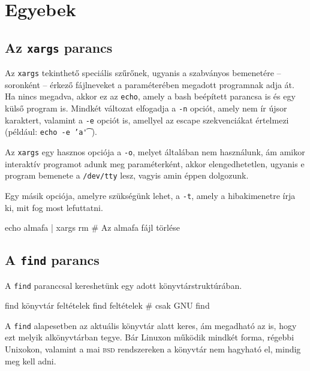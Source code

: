 \chapter{Egyebek}%
\label{cha:others}




\section{Az \texttt{xargs} parancs}

Az \texttt{xargs} tekinthető speciális szűrőnek, ugyanis a szabványos bemenetére
-- soronként -- érkező fájlneveket a paraméterében megadott programnak adja
át. Ha nincs megadva, akkor ez az \texttt{echo}, amely a bash beépített parancsa
is és egy külső program is. Mindkét változat elfogadja a \texttt{-n} opciót,
amely nem ír újsor karaktert, valamint a \texttt{-e} opciót is, amellyel az
escape szekvenciákat értelmezi (például: \texttt{echo -e 'a\t'}).

Az \texttt{xargs} egy hasznos opciója a \texttt{-o}, melyet általában nem
használunk, ám amikor interaktív programot adunk meg paraméterként, akkor
elengedhetetlen, ugyanis e program bemenete a \texttt{/dev/tty} lesz, vagyis
amin éppen dolgozunk.

Egy másik opciója, amelyre szükségünk lehet, a \texttt{-t}, amely a
hibakimenetre írja ki, mit fog most lefuttatni.


\begin{VerbExample}
echo almafa | xargs rm            # Az almafa fájl törlése
\end{VerbExample}




\section{A \texttt{find} parancs}

A \texttt{find} paranccsal kereshetünk egy adott könyvtárstruktúrában.

\begin{VerbExample}
find könyvtár feltételek
find feltételek            # csak GNU find
\end{VerbExample}

A \texttt{find} alapesetben az aktuális könyvtár alatt keres, ám megadható az
is, hogy ezt melyik alkönyvtárban tegye. Bár Linuxon működik mindkét forma,
régebbi Unixokon, valamint a mai \textsc{bsd} rendszereken a könyvtár nem
hagyható el, mindig meg kell adni.

